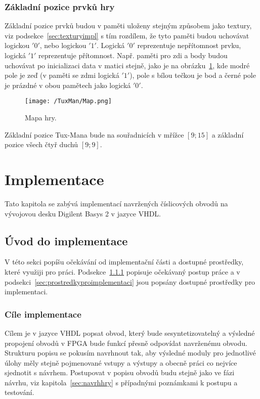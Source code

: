 \documentclass{report}
\begin{document}
\subsection{Základní pozice prvků hry}
Základní pozice prvků budou v paměti uloženy stejným způsobem jako textury, viz podsekce~\ref{sec:texturyimpl} s tím rozdílem, že tyto paměti budou uchovávat logickou $'0'$, nebo logickou $'1'$. Logická $'0'$ reprezentuje nepřítomnost prvku, logická $'1'$ reprezentuje přítomnost. Např. paměti pro zdi a body budou uchovávat po inicializaci data v matici stejně, jako je na obrázku~\ref{fig:gamemap}, kde modré pole je zeď (v paměti se zdmi logická $'1'$), pole s bílou tečkou je bod a černé pole je prázdné v obou pamětech jako logická $'0'$.
\begin{figure}
\centering
\texttt{[image: /TuxMan/Map.png]}
\caption{Mapa hry.}
\label{fig:gamemap}
\end{figure}
Základní pozice Tux-Mana bude na souřadnicích v mřížce $[9;15]$ a základní pozice všech čtyř duchů $[9;9]$. 
\chapter{Implementace}\label{sec:implementacechap}
Tato kapitola se zabývá implementací navržených číslicových obvodů na vývojovou desku Digilent Basys 2 v jazyce VHDL. 
\section{Úvod do implementace}
V této sekci popíšu očekávání od implementační části a dostupné prostředky, které využiji pro práci. Podsekce~\ref{sec:cileimplementace} popisuje očekávaný postup práce a v podsekci~\ref{sec:prostredkyproimplementaci} jsou popsány dostupné prostředky pro implementaci.  
\subsection{Cíle implementace}\label{sec:cileimplementace}
Cílem je v jazyce VHDL popsat obvod, který bude sesyntetizovatelný a výsledné propojení obvodů v FPGA bude funkcí přesně odpovídat navrženému obvodu. Strukturu popisu se pokusím navrhnout tak, aby výsledné moduly pro jednotlivé úlohy měly stejně pojmenované vstupy a výstupy a obecně práci co nejvíce sjednotit s návrhem. Postupovat v popisu obvodů budu stejně jako ve fázi návrhu, viz kapitola~\ref{sec:navrhhry} s případnými poznámkami k postupu a testování.
\end{document}
